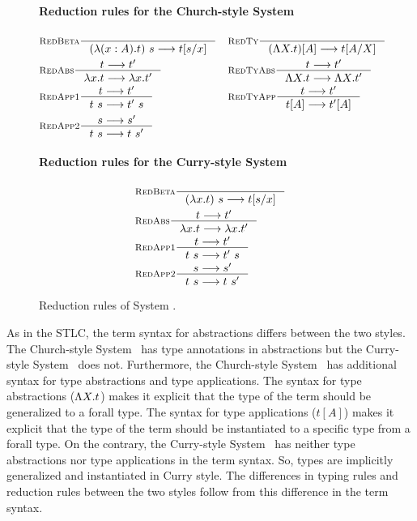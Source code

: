 \begin{figure}
\paragraph{Reduction rules for the Church-style System \F}
\begin{align*}
& \inference[\sc RedBeta]{}{(\l(x:A).t)~s --> t[s/x]}
&&\inference[\sc RedTy]{}{(\L X   .t)[A] --> t[A/X]} \\
& \inference[\sc RedAbs]{t --> t'}{\l x   .t --> \l x   .t'}
&&\inference[\sc RedTyAbs]{t --> t'}{\L X   .t --> \L X   .t'} \\
& \inference[\sc RedApp1]{t --> t'}{t~s --> t'~s}
&&\inference[\sc RedTyApp]{t --> t'}{t[A] --> t'[A]} \\
& \inference[\sc RedApp2]{s --> s'}{t~s --> t~s'}
\end{align*}
\paragraph{Reduction rules for the Curry-style System \F}
\begin{align*}
& \inference[\sc RedBeta]{}{(\l x   .t)~s --> t[s/x]} \\
& \inference[\sc RedAbs]{t --> t'}{\l x   .t --> \l x   .t'} \\
& \inference[\sc RedApp1]{t --> t'}{t~s --> t'~s} \\
& \inference[\sc RedApp2]{s --> s'}{t~s --> t~s'}
\end{align*}
\caption{Reduction rules of System \F.}
\label{fig:redf}
\end{figure}



As in the STLC, the term syntax for abstractions differs between the two styles.
The Church-style System \F\ has type annotations in abstractions but
the Curry-style System \F\ does not. Furthermore, the Church-style System \F\
has additional syntax for type abstractions and type applications. The syntax
for type abstractions ($\Lambda X.t$) makes it explicit that the type of the term
should be generalized to a forall type. The syntax for type applications
($t[A]$) makes it explicit that the type of the term should be instantiated to
a specific type from a forall type. On the contrary, the Curry-style System \F\
has neither type abstractions nor type applications in the term syntax.
So, types are implicitly generalized and instantiated in Curry style.
The differences in typing rules and reduction rules between the two styles
follow from this difference in the term syntax.

